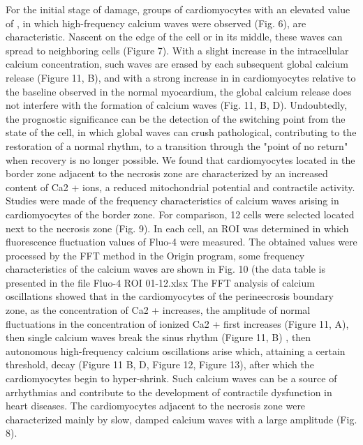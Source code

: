 \documentclass{biophys-new}
\begin{document}
 For the initial stage of damage, groups of cardiomyocytes with an elevated value of , in which high-frequency calcium waves were observed (Fig. 6), are characteristic.
 Nascent on the edge of the cell or in its middle, these waves can spread to neighboring cells (Figure 7).
 With a slight increase in the intracellular calcium concentration, such waves are erased by each subsequent global calcium release (Figure 11, B), and with a strong increase in  in cardiomyocytes relative to the baseline observed in the normal myocardium, the global calcium release does not interfere with the formation of calcium waves (Fig. 11, B, D).
 Undoubtedly, the prognostic significance can be the detection of the switching point from the state of the cell, in which global waves can crush pathological, contributing to the restoration of a normal rhythm, to a transition through the "point of no return" when recovery is no longer possible.
 We found that cardiomyocytes located in the border zone adjacent to the necrosis zone are characterized by an increased content of Ca2 + ions, a reduced mitochondrial potential and contractile activity. Studies were made of the frequency characteristics of calcium waves arising in cardiomyocytes of the border zone.
 For comparison, 12 cells were selected located next to the necrosis zone (Fig. 9).
 In each cell, an ROI was determined in which fluorescence fluctuation values of Fluo-4 were measured.
 The obtained values were processed by the FFT method in the Origin program, some frequency characteristics of the calcium waves are shown in Fig. 10 (the data table is presented in the file Fluo-4 ROI 01-12.xlsx
 The FFT analysis of calcium oscillations showed that in the cardiomyocytes of the perineecrosis boundary zone, as the concentration of Ca2 + increases, the amplitude of normal fluctuations in the concentration of ionized Ca2 + first increases (Figure 11, A), then single calcium waves break the sinus rhythm (Figure 11, B) ,
 then autonomous high-frequency calcium oscillations arise which, attaining a certain threshold, decay (Figure 11 B, D, Figure 12, Figure 13), after which the cardiomyocytes begin to hyper-shrink. Such calcium waves can be a source of arrhythmias and contribute to the development of contractile dysfunction in heart diseases.
 The cardiomyocytes adjacent to the necrosis zone were characterized mainly by slow, damped calcium waves with a large amplitude (Fig. 8).
\end{document}
